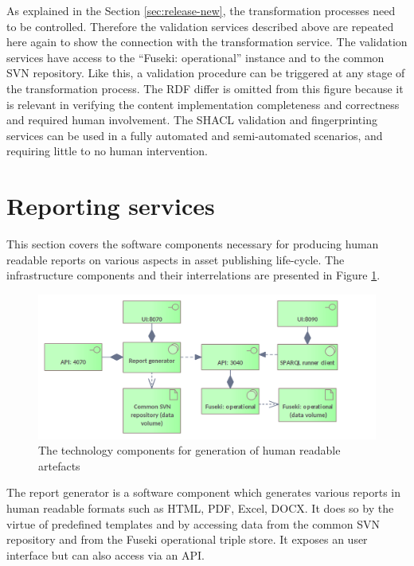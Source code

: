	As explained in the Section \ref{sec:release-new}, the transformation processes need to be controlled. Therefore the validation services described above are repeated here again to show the connection with the transformation service. The validation services have access to the ``Fuseki: operational'' instance and to the common SVN repository. Like this, a validation procedure can be triggered at any stage of the transformation process. The RDF differ is omitted from this figure because it is relevant in verifying the content implementation completeness and correctness and required human involvement. The SHACL validation and fingerprinting services can be used in a fully automated and semi-automated scenarios, and requiring little to no human intervention.
		
		
	\section{Reporting services}
	\label{sec:technology-view-reporting}
	
	This section covers the software components necessary for producing human readable reports on various aspects in asset publishing life-cycle. The infrastructure components and their interrelations are presented in Figure \ref{fig:technology-view-reporting}. 
	
	\begin{figure}[!h]
		\centering
		\includegraphics[width=.8\textwidth]{images/infra-setup/reporting.png}
		\caption{The technology components for generation of human readable artefacts}
		\label{fig:technology-view-reporting}
	\end{figure}
	
	The report generator is a software component which generates various reports in human readable formats such as HTML, PDF, Excel, DOCX. It does so by the virtue of predefined templates and by accessing data from the common SVN repository and from the Fuseki operational triple store. It exposes an user interface but can also access via an API.
	
